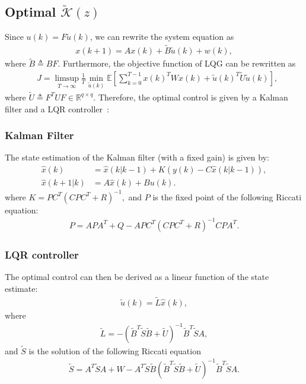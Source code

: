 
  \subsection{Optimal $\tilde {\mathcal K}(z)$}

  Since $u(k) = F \tilde u(k)$, we can rewrite the system equation as
  \begin{align*}
    x(k+1) = A x(k) + \tilde B\tilde u(k) + w(k),
  \end{align*}
  where $\tilde B\triangleq BF$. Furthermore, the objective function of LQG can be rewritten as
  \begin{align*}
    &J = \limsup_{T\rightarrow \infty}\frac{1}{T}\min_{\tilde u(k)}\mathbb{E}\left[\sum_{k=0}^{T-1} x(k)^TWx(k)+\tilde u(k)^T\tilde U\tilde u(k)\right],
  \end{align*}
  where $\tilde U \triangleq F^TUF\in \mathbb R^{q\times q}$. Therefore, the optimal control is given by a Kalman filter and a LQR controller~\cite{Schenato:2007dh}:
  \subsubsection*{Kalman Filter}
  The state estimation of the Kalman filter (with a fixed gain) is given by:
  \begin{align*}
    \hat x(k)& = \hat x(k|k - 1)  + K (y(k)  - C \hat x (k|k - 1) ) ,\\
    \hat x (k + 1|k) & = A \hat x(k) +Bu(k).
  \end{align*}
  where
$    K= P C^T (CP C^T  + R)^{ - 1}, $
  and $P$ is the fixed point of the following Riccati equation:
  \begin{align*}
    P = APA^T+Q - APC^T(CPC^T+R)^{-1}CPA^T.
  \end{align*}
  \subsubsection*{LQR controller}
  The optimal control can then be derived as a linear function of the state estimate:
  \begin{align}
    \tilde u(k) = \tilde L \hat x(k),
  \end{align}
  where
  \begin{align*}
    \tilde L = -(\tilde B^T\tilde S \tilde B + \tilde U)^{-1}\tilde B^T\tilde S A,
  \end{align*}
  and $\tilde S$ is the solution of the following Riccati equation
  \begin{align}
    \tilde S =  A^T \tilde SA+W - A^T\tilde S\tilde B(\tilde B^T\tilde S\tilde B+\tilde U)^{-1}\tilde B^T \tilde SA.
    \label{eq:tildeS}
  \end{align}


